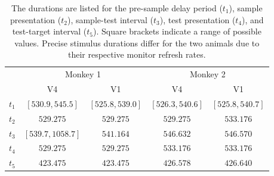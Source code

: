 \begin{table}[bthp]
{%
%
\begin{tabular}{lcccc}
\toprule
                            & \multicolumn{2}{c}{Monkey 1}          & \multicolumn{2}{c}{Monkey 2}          \\
                            \cmidrule(r){2-3}                       \cmidrule(l){4-5}
                            & \acs{V4}          & \acs{V1}          & \acs{V4}          & \acs{V1}          \\
\midrule
$t_1$                       & $[530.9, 545.5]$  & $[525.8, 539.0]$  & $[526.3, 540.6]$  & $[525.8, 540.7]$  \\
$t_2$                       & $529.275$         & $529.275$         & $529.275$         & $533.176$         \\
$t_3$                       & $[539.7, 1058.7]$ & $541.164$         & $546.632$         & $546.570$         \\
$t_4$                       & $529.275$         & $529.275$         & $533.176$         & $533.176$         \\
$t_5$                       & $423.475$         & $423.475$         & $426.578$         & $426.640$         \\
\bottomrule
%
\end{tabular}
} %
\caption{
The durations are listed for the
pre-sample delay period ($t_1$),
sample presentation ($t_2$),
sample-test interval ($t_3$),
test presentation ($t_4$), and
test-target interval ($t_5$).
Square brackets indicate a range of possible values.
Precise stimulus durations differ for the two animals due to their respective monitor refresh rates.
}
\label{tab:tptimes}
\end{table}


